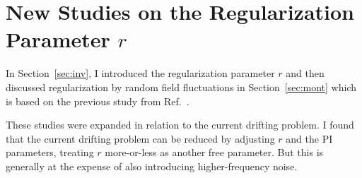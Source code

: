 
% 









\section{New Studies on the Regularization Parameter $r$}\label{sec:new_study_r}

In Section~\ref{sec:inv}, I introduced the regularization parameter $r$
and then discussed regularization by random field fluctuations in
Section~\ref{sec:mont} which is based on the previous study from
Ref.~\cite{bea}.

These studies were expanded in relation to the current drifting
problem.  I found that the current drifting problem can be reduced by
adjusting $r$ and the PI parameters, treating $r$ more-or-less as
another free parameter.  But this is generally at the expense of also
introducing higher-frequency noise.

